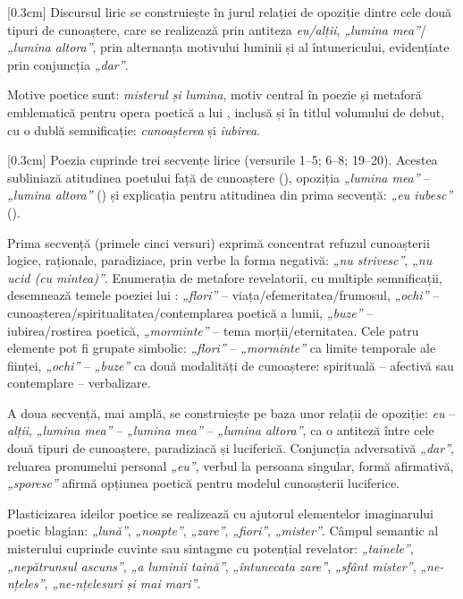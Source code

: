 [0.3cm]
Discursul liric se construiește în jurul relației de opoziție dintre cele două tipuri de cunoaștere, care se realizează prin antiteza \textit{eu/alții}, \textit{„lumina mea”}/\textit{„lumina altora”}, prin alternanța motivului luminii și al întunericului, evidențiate prin conjuncția \textit{„dar”}.

Motive poetice sunt: \textit{misterul și lumina}, motiv central în poezie și metaforă emblematică pentru opera poetică a lui \operaauthor, inclusă și în titlul volumului de debut, cu o dublă semnificație: \textit{cunoașterea} și \textit{iubirea}.

[0.3cm]
Poezia cuprinde trei secvențe lirice (versurile 1--5; 6--8; 19--20). Acestea subliniază atitudinea poetului față de cunoaștere (), opoziția \textit{„lumina mea”} -- \textit{„lumina altora”} () și explicația pentru atitudinea din prima secvență: \textit{„eu iubesc”} ().

Prima secvență (primele cinci versuri) exprimă concentrat refuzul cunoașterii logice, raționale, paradiziace, prin verbe la forma negativă: \textit{„nu strivesc”}, \textit{„nu ucid (cu mintea)”}. Enumerația de metafore revelatorii, cu multiple semnificații, desemnează temele poeziei lui \operaauthor: \textit{„flori”} -- viața/efemeritatea/frumosul, \textit{„ochi”} -- cunoașterea/spiritualitatea/contemplarea poetică a lumii, \textit{„buze”} -- iubirea/rostirea poetică, \textit{„morminte”} -- tema morții/eternitatea. Cele patru elemente pot fi grupate simbolic: \textit{„flori”} -- \textit{„morminte”} ca limite temporale ale ființei, \textit{„ochi”} -- \textit{„buze”} ca două modalități de cunoaștere: spirituală -- afectivă sau contemplare -- verbalizare.

A doua secvență, mai amplă, se construiește pe baza unor relații de opoziție: \textit{eu} -- \textit{alții}, \textit{„lumina mea”} -- \textit{„lumina mea”} -- \textit{„lumina altora”}, ca o antiteză între cele două tipuri de cunoaștere, paradiziacă și luciferică. Conjuncția adversativă \textit{„dar”}, reluarea pronumelui personal \textit{„eu”}, verbul la persoana  singular, formă afirmativă, \textit{„sporesc”} afirmă opțiunea poetică pentru modelul cunoașterii luciferice.

Plasticizarea ideilor poetice se realizează cu ajutorul elementelor imaginarului poetic blagian: \textit{„lună”}, \textit{„noapte”}, \textit{„zare”}, \textit{„fiori”}, \textit{„mister”}. Câmpul semantic al misterului cuprinde cuvinte sau sintagme cu potențial revelator: \textit{„tainele”}, \textit{„nepătrunsul ascuns”}, \textit{„a luminii taină”}, \textit{„întunecata zare”}, \textit{„sfânt mister”}, \textit{„ne-nțeles”}, \textit{„ne-nțelesuri și mai mari”}.

